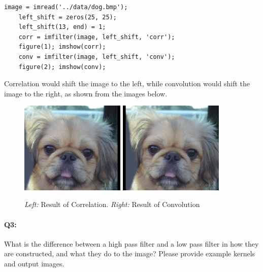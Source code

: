     \begin{lstlisting}[style=Matlab-editor]
    image = imread('../data/dog.bmp');
    left_shift = zeros(25, 25);
    left_shift(13, end) = 1;
    corr = imfilter(image, left_shift, 'corr');
    figure(1); imshow(corr);
    conv = imfilter(image, left_shift, 'conv');
    figure(2); imshow(conv);
    \end{lstlisting}
    Correlation would shift the image to the left, while convolution would shift the image to the right, as shown from the images below.
    \begin{figure}[h]
        \centering
        \includegraphics[width=5cm]{corr.jpg}
        \includegraphics[width=5cm]{conv.jpg}
        \caption{\emph{Left:} Result of Correlation. \emph{Right:} Result of Convolution}
    \end{figure}


	\pagebreak
	\paragraph{Q3:} What is the difference between a high pass filter and a low pass filter in how they are constructed, and what they do to the image? Please provide example kernels and output images.

